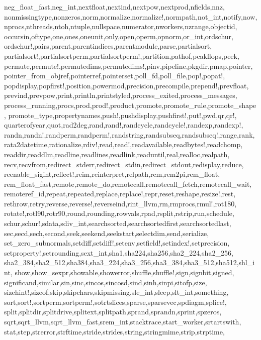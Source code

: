 {{neg_float_fast,neg_int,nextfloat,nextind,nextpow,nextprod,nfields,nnz,%
nonmissingtype,nonzeros,norm,normalize,normalize!,normpath,not_int,notify,now,%
nprocs,nthreads,ntoh,ntuple,nullspace,numerator,nworkers,nzrange,objectid,%
occursin,oftype,one,ones,oneunit,only,open,operm,opnorm,or_int,ordschur,%
ordschur!,pairs,parent,parentindices,parentmodule,parse,partialsort,%
partialsort!,partialsortperm,partialsortperm!,partition,pathof,peakflops,peek,%
permute,permute!,permutedims,permutedims!,pinv,pipeline,pkgdir,pmap,pointer,%
pointer_from_objref,pointerref,pointerset,poll_fd,poll_file,pop!,popat!,%
popdisplay,popfirst!,position,powermod,precision,precompile,prepend!,prevfloat,%
prevind,prevpow,print,println,printstyled,process_exited,process_messages,%
process_running,procs,prod,prod!,product,promote,promote_rule,promote_shape,%
promote_type,propertynames,push!,pushdisplay,pushfirst!,put!,pwd,qr,qr!,%
quarterofyear,quot,rad2deg,rand,rand!,randcycle,randcycle!,randexp,randexp!,%
randn,randn!,randperm,randperm!,randstring,randsubseq,randsubseq!,range,rank,%
rata2datetime,rationalize,rdiv!,read,read!,readavailable,readbytes!,readchomp,%
readdir,readdlm,readline,readlines,readlink,readuntil,real,realloc,realpath,%
recv,recvfrom,redirect_stderr,redirect_stdin,redirect_stdout,redisplay,reduce,%
reenable_sigint,reflect!,reim,reinterpret,relpath,rem,rem2pi,rem_float,%
rem_float_fast,remote,remote_do,remotecall,remotecall_fetch,remotecall_wait,%
remoteref_id,repeat,repeated,replace,replace!,repr,reset,reshape,resize!,rest,%
rethrow,retry,reverse,reverse!,reverseind,rint_llvm,rm,rmprocs,rmul!,rot180,%
rotate!,rotl90,rotr90,round,rounding,rowvals,rpad,rsplit,rstrip,run,schedule,%
schur,schur!,sdata,sdiv_int,searchsorted,searchsortedfirst,searchsortedlast,%
sec,secd,sech,second,seek,seekend,seekstart,selectdim,send,serialize,%
set_zero_subnormals,setdiff,setdiff!,setenv,setfield!,setindex!,setprecision,%
setproperty!,setrounding,sext_int,sha1,sha224,sha256,sha2_224,sha2_256,%
sha2_384,sha2_512,sha384,sha3_224,sha3_256,sha3_384,sha3_512,sha512,shl_int,%
show,show_sexpr,showable,showerror,shuffle,shuffle!,sign,signbit,signed,%
significand,similar,sin,sinc,sincos,sincosd,sind,sinh,sinpi,sitofp,size,%
sizehint!,sizeof,skip,skipchars,skipmissing,sle_int,sleep,slt_int,something,%
sort,sort!,sortperm,sortperm!,sotrtslices,sparse,sparsevec,spdiagm,splice!,%
split,splitdir,splitdrive,splitext,splitpath,sprand,sprandn,sprint,spzeros,%
sqrt,sqrt_llvm,sqrt_llvm_fast,srem_int,stacktrace,start_worker,srtartswith,%
stat,step,strerror,strftime,stride,strides,string,stringmime,strip,strptime,%
}}
